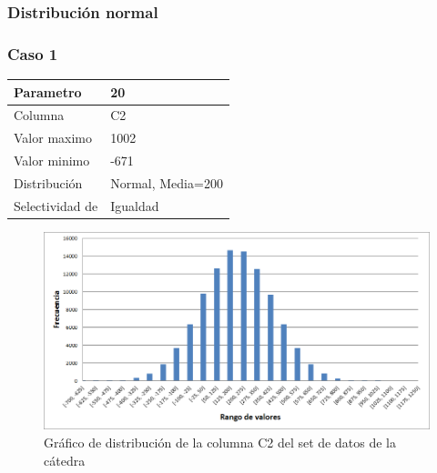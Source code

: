 	
	\subsubsection{Distribuci\'on normal}		
		
		\subsubsection*{Caso 1}
		
		\begin{tabular}{| l | l |}
		\hline
		Parametro & 20 \\
		\hline
		Columna & C2 \\
		\hline
		Valor maximo & 1002 \\
		\hline
		Valor minimo & -671 \\
		\hline
		Distribuci\'on & Normal, Media=200 \\
		\hline
		Selectividad de & Igualdad \\
		\hline
		\end{tabular}
		
		\quad 
		
		\quad 

	\begin{figure}[H]
	  \begin{center}
	    \includegraphics[scale=.60]{imagenes/distro_C2.png}
	    \caption{Gr\'afico de distribuci\'on de la columna C2 del set de datos de la c\'atedra} 
	    \label{fig:(distro_C2}
	  \end{center}
	\end{figure}


